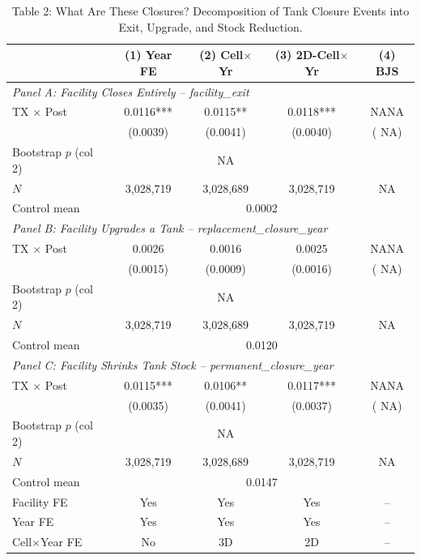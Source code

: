 \begin{table}[htbp]
\centering
\caption{Table 2: What Are These Closures? Decomposition of Tank Closure Events into Exit, Upgrade, and Stock Reduction.}
\label{tab:t2_closure_composition}
\begin{tabular}{lcccc}
\toprule
 & (1) Year FE & (2) Cell$\times$Yr & (3) 2D-Cell$\times$Yr & (4) BJS \\
\midrule
\multicolumn{5}{l}{\textit{Panel A: Facility Closes Entirely -- \textit{facility\_exit}}} \\[0.3em]
TX $\times$ Post & 0.0116*** & 0.0115** & 0.0118*** &    NANA \\
                  & (0.0039) & (0.0041) & (0.0040) & (   NA) \\
Bootstrap $p$ (col 2) & &   NA & \multicolumn{2}{c}{} \\
$N$               & 3,028,719 & 3,028,689 & 3,028,719 & NA \\
Control mean      & \multicolumn{4}{c}{0.0002} \\
\midrule
\multicolumn{5}{l}{\textit{Panel B: Facility Upgrades a Tank -- \textit{replacement\_closure\_year}}} \\[0.3em]
TX $\times$ Post & 0.0026 & 0.0016 & 0.0025 &    NANA \\
                  & (0.0015) & (0.0009) & (0.0016) & (   NA) \\
Bootstrap $p$ (col 2) & &   NA & \multicolumn{2}{c}{} \\
$N$               & 3,028,719 & 3,028,689 & 3,028,719 & NA \\
Control mean      & \multicolumn{4}{c}{0.0120} \\
\midrule
\multicolumn{5}{l}{\textit{Panel C: Facility Shrinks Tank Stock -- \textit{permanent\_closure\_year}}} \\[0.3em]
TX $\times$ Post & 0.0115*** & 0.0106** & 0.0117*** &    NANA \\
                  & (0.0035) & (0.0041) & (0.0037) & (   NA) \\
Bootstrap $p$ (col 2) & &   NA & \multicolumn{2}{c}{} \\
$N$               & 3,028,719 & 3,028,689 & 3,028,719 & NA \\
Control mean      & \multicolumn{4}{c}{0.0147} \\
\midrule
Facility FE            & Yes & Yes & Yes & -- \\
Year FE                & Yes & Yes & Yes & -- \\
Cell$\times$Year FE   & No  & 3D  & 2D  & -- \\

\end{tabular}
\end{table}
